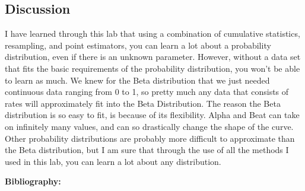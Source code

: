 \documentclass{article}\usepackage[]{graphicx}\usepackage[]{xcolor}
\begin{document}
\begin{multicols}{2}
\section{Discussion}
I have learned through this lab that using a combination of cumulative statistics, resampling, and point estimators, you can learn a lot about a probability distribution, even if there is an unknown parameter. However, without a data set that fits the basic requirements of the probability distribution, you won't be able to learn as much. We knew for the Beta distribution that we just needed continuous data ranging from 0 to 1, so pretty much any data that consists of rates will approximately fit into the Beta Distribution. The reason the Beta distribution is so easy to fit, is because of its flexibility. Alpha and Beat can take on infinitely many values, and can so drastically change the shape of the curve. Other probability distributions are probably more difficult to approximate than the Beta distribution, but I am sure that through the use of all the methods I used in this lab, you can learn a lot about any distribution.
\vspace{2em}

\noindent\textbf{Bibliography:} 

\begin{tiny}

\end{tiny}
\end{multicols}
\end{document}

